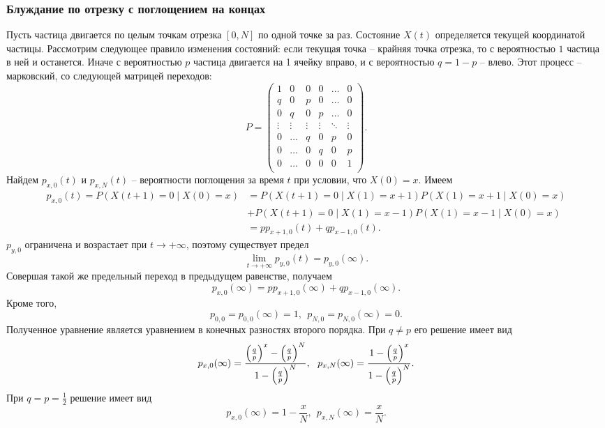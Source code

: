 \subsubsection{Блуждание по отрезку с поглощением на концах}
Пусть частица двигается по целым точкам отрезка $[0, N]$ по одной точке за раз.
Состояние $X(t)$ определяется текущей координатой частицы. Рассмотрим следующее 
правило изменения состояний: если текущая точка -- крайняя точка отрезка,
то с вероятностью $1$ частица в ней и останется. Иначе с вероятностью
$p$ частица двигается на 1 ячейку вправо, и с вероятностью $q = 1 - p$ -- влево.
Этот процесс -- марковский, со следующей матрицей переходов:
\[
    P = \begin{pmatrix}
        1 & 0 & 0 & 0 & \ldots & 0 \\
        q & 0 & p & 0 & \ldots & 0 \\
        0 & q & 0 & p & \ldots & 0 \\
        \vdots & \vdots & \vdots & \vdots & \ddots & \vdots \\
        0 & \ldots & q & 0 & p & 0 \\
        0 & \ldots & 0 & q & 0 & p \\
        0 & \ldots & 0 & 0 & 0 & 1 \\
    \end{pmatrix}
.\]
Найдем $p_{x, 0}(t)$ и $p_{x, N}(t)$ -- вероятности поглощения за время
$t$ при условии, что $X(0) = x$. Имеем
\begin{align*}
    p_{x, 0}(t) = P(X(t + 1) = 0 \mid X(0) = x) 
    &= P(X(t + 1) = 0 \mid X(1) = x + 1) 
    P(X(1) = x + 1 \mid X(0) = x) \\
    &+ P(X(t + 1) = 0 \mid X(1) = x - 1)
    P(X(1) = x - 1 \mid X(0) = x) \\
    &= p p_{x + 1, 0}(t) + q p_{x - 1, 0}(t)
.\end{align*}
$p_{y, 0}$ ограничена и возрастает при $t \to +\infty$, поэтому существует 
предел
\[
    \lim_{t \to +\infty}{p_{y, 0}(t)} = p_{y, 0}(\infty)
.\]
Совершая такой же предельный переход в предыдущем равенстве, получаем
\[
    p_{x, 0}(\infty) = p p_{x + 1, 0}(\infty) + q p_{x - 1, 0}(\infty)
.\]
Кроме того,
\[
    p_{0, 0} = p_{0, 0}(\infty) = 1,~~ p_{N, 0} = p_{N, 0}(\infty) = 0 
.\]
Полученное уравнение является уравнением в конечных разностях второго порядка.
При $q \neq p$ его решение имеет вид
\[
    p_{x, 0}(\infty) = \frac{\parens*{\frac{q}{p}}^x - \parens*{\frac{q}{p}}^N}
    {1 - \parens*{\frac{q}{p}}^N},~~
    p_{x, N}(\infty) = \frac{1 - \parens*{\frac{q}{p}}^x}{1 - \parens*{\frac{q}{p}}^N}
.\]
При $q = p = \frac{1}{2}$ решение имеет вид
\[
    p_{x, 0}(\infty) = 1 - \frac{x}{N},~~ p_{x, N}(\infty) = \frac{x}{N}
.\]


